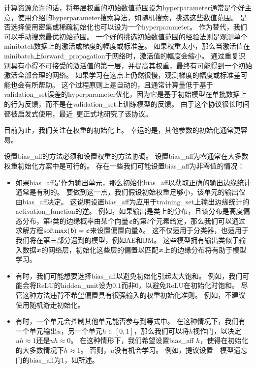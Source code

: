 计算资源允许的话，将每层权重的初始数值范围设为\gls{hyperparameter}通常是个好主意，使用介绍的\gls{hyperparameter}搜索算法，如随机搜索，挑选这些数值范围。
是否选择使用密集或稀疏初始化也可以设为一个\gls{hyperparameter}。
作为替代，我们可以手动搜索最优初始范围。
一个好的挑选初始数值范围的经验法则是观测单个\gls{minibatch}数据上的激活或梯度的幅度或标准差。
如果权重太小，那么当激活值在\gls{minibatch}上\gls{forward_propagation}于网络时，激活值的幅度会缩小。
通过重复识别具有小得不可接受的激活值的第一层，并提高其权重，最终有可能得到一个初始激活全部合理的网络。
如果学习在这点上仍然很慢，观测梯度的幅度或标准差可能也会有所帮助。
这个过程原则上是自动的，且通常计算量低于基于\gls{validation_set}误差的\gls{hyperparameter}优化，因为它是基于初始模型在单批数据上的行为反馈，而不是在\gls{validation_set}上训练模型的反馈。
由于这个协议很长时间都被启发式使用，最近~\cite{mishkin2015all}更正式地研究了该协议。


目前为止，我们关注在权重的初始化上。
幸运的是，其他参数的初始化通常更容易。


设置\gls{bias_aff}的方法必须和设置权重的方法协调。
设置\gls{bias_aff}为零通常在大多数权重初始化方案中是可行的。
存在一些我们可能设置\gls{bias_aff}为非零值的情况：

\begin{itemize}
\item 如果\gls{bias_aff}是作为输出单元，那么初始化\gls{bias_aff}以获取正确的输出边缘统计通常是有利的。
要做到这一点，我们假设初始权重足够小，该单元的输出仅由\gls{bias_aff}决定。
这说明设置\gls{bias_aff}为应用于\gls{training_set}上输出边缘统计的\gls{activation_function}的逆。
例如，如果输出是类上的分布，且该分布是高度偏态分布，第$i$类的边缘概率由某个向量$\boldsymbol{\mathit{c}}$的第$i$个元素给定，那么我们可以通过求解方程$\text{softmax}(\boldsymbol{\mathit{b}})=\boldsymbol{\mathit{c}}$来设置偏置向量$\boldsymbol{\mathit{b}}$。
这不仅适用于分类器，也适用于我们将在第三部分遇到的模型，例如\gls{AE}和\gls{BM}。
这些模型拥有输出类似于输入数据$\boldsymbol{\mathit{x}}$的网络层，初始化这些层的偏置以匹配$\boldsymbol{\mathit{x}}$上的边缘分布将有助于模型学习。


\item 有时，我们可能想要选择\gls{bias_aff}以避免初始化引起太大饱和。
例如，我们可能会将ReLU的\gls{hidden_unit}设为$0.1$而非$0$，以避免ReLU在初始化时饱和。
尽管这种方法违背不希望偏置具有很强输入的权重初始化准则。
例如，不建议使用随机游走初始化\citep{Sussillo14}。


\item 有时，一个单元会控制其他单元能否参与到等式中。
在这种情况下，我们有一个单元输出$u$，另一个单元$h\in[0,1]$，那么我们可以将$h$视作门，以决定$uh\approx 1$还是$uh\approx 0$。
在这种情形下，我们希望设置\gls{bias_aff} $h$，使得在初始化的大多数情况下$h\approx 1$。
否则，$u$没有机会学习。
例如，\cite{Jozefowicz-et-al-ICML2015}提议设置~~模型遗忘门的\gls{bias_aff}为$1$，如所述。
\end{itemize}


